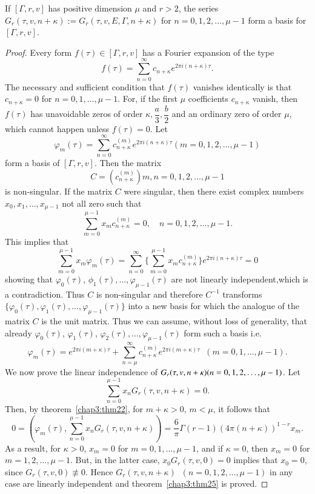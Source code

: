 \begin{thm}\label{chap3:thm25}
If $[\Gamma, r, v]$ has positive dimension $\mu$ and $r>2$, the series
$G_r(\tau, v, n+\kappa):=G_r(\tau,v,E,\Gamma, n+\kappa)$ for
$n=0,1,2,\ldots, \mu-1$ form a basis for $[\Gamma, r,v]$.
\end{thm}

\begin{proof}
Every form $f(\tau)\in [\Gamma,r,v]$ has a Fourier expansion
of the type
$$
f(\tau)=\sum^{\infty}_{n=0} c_{n+\kappa} e^{2\pi i (n+\kappa)\tau}.
$$
The necessary and sufficient condition that $f(\tau)$ vanishes
identically is that \pageoriginale $c_{n+\kappa}=0$ for $n=0,1,\ldots
, \mu-1$. For, if the first $\mu$ coefficients $c_{n+\kappa}$ vanish,
then $f(\tau)$ has unavoidable zeros of order
$\kappa,\dfrac{a}{3},\dfrac{b}{2}$ and an ordinary zero of order
$\mu$, which cannot happen unless $f(\tau)=0$. Let 
$$
\varphi_m(\tau) = \sum^{\infty}_{n=0} c^{(m)}_{n+\kappa} e^{2\pi i
  (n+\kappa)\tau} (m=0,1,2,\ldots,\mu-1)
$$
form a basis of $[\Gamma,r,v]$. Then the matrix 
$$
C = (c^{(m)}_{n+\kappa}) m,n =0,1,2,\ldots,\mu-1
$$
is non-singular. If the matrix $C$ were singular, then there exist
complex numbers $x_0, x_1, \ldots, x_{\mu-1}$ not all zero such that 
$$
\sum^{\mu-1}_{m=0} x_m c^{(m)}_{n+\kappa} = 0, \quad n = 0,1,2,\ldots,
\mu-1. 
$$
This implies that 
$$
\sum^{\mu-1}_{m=0} x_m \varphi_m(\tau) = \sum^{\infty}_{n=0}
\{\sum^{\mu-1}_{m=0} x_m c^{(m)}_{n+\kappa}\}e^{2\pi i(n+\kappa)\tau}=0
$$
showing that $\varphi_0(\tau)$, $\phi_1(\tau),\ldots,
\varphi_{\mu-1}(\tau)$ are not linearly independent,\break which is a
contradiction. Thus $C$ is non-singular and therefore $C^{-1}$
transforms $\{\varphi_0(\tau), \varphi_1(\tau),\ldots,
\varphi_{\mu-1}(\tau)\}$ into a new basis for which the analogue of the
matrix $C$ is the unit matrix. Thus we can assume, without loss of
generality, that already $\varphi_0(\tau)$, $\varphi_1(\tau)$,
$\varphi_2(\tau),\ldots, \varphi_{\mu-1}(\tau)$ form such a basis
i.e. 
$$
\varphi_m(\tau) =e^{2\pi i(m+\kappa)\tau} + \sum^{\infty}_{n=\mu} 
c^{(m)}_{n+\kappa} e^{2\pi i(m+\kappa)\tau} \;\; (m=0,1,\ldots, \mu-1).
$$
We now prove the linear independence of
$G_r(\tau,v,n+\kappa)(n=0,1,2,\ldots,\break \mu-1)$. Let 
$$
\sum^{\mu-1}_{n=0} x_n G_r (\tau,v,n+\kappa)=0.
$$
Then, \pageoriginale by theorem~\ref{chap3:thm22}, for $m+\kappa >0$, $m<\mu$, it
follows that
$$
0=(\varphi_m(\tau), \sum^{\mu-1}_{n=0} x_n G_r(\tau,v,n+\kappa)) =
\frac{6}{\pi} \Gamma(r-1) (4\pi(n+\kappa))^{1-r} x_m.
$$
As a result, for $\kappa>0$, $x_m=0$ for $m=0,1,\ldots, \mu-1$, and
if $\kappa=0$, then $x_m=0$ for $m=1,2,\ldots,\mu-1$. But, in the
latter case, $x_0G_r(\tau,v,0)=0$ implies that $x_0=0$, since
$G_r(\tau,v,0)\not\equiv 0$. Hence
$G_r(\tau,v,n+\kappa) \;\; (n=0,1,2,\ldots, \mu-1)$ in any case are linearly
independent and theorem~\ref{chap3:thm25} is proved.


\end{proof}
